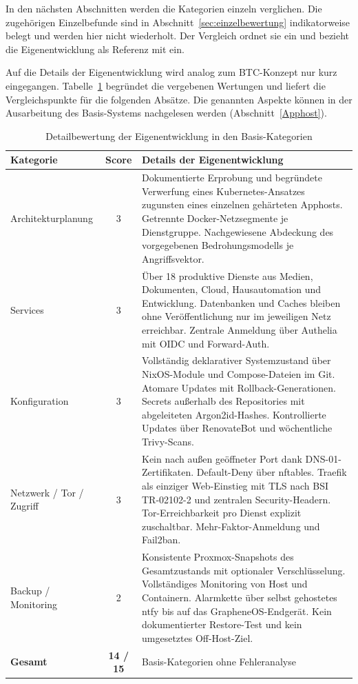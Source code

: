 {In den nächsten Abschnitten werden die Kategorien einzeln verglichen. Die zugehörigen Einzelbefunde sind in Abschnitt~\ref{sec:einzelbewertung} indikatorweise belegt und werden hier nicht wiederholt. Der Vergleich ordnet sie ein und bezieht die Eigenentwicklung als Referenz mit ein.

Auf die Details der Eigenentwicklung wird analog zum \ac{BTC}-Konzept nur kurz eingegangen. Tabelle~\ref{tab:basis-eigen-details} begründet die vergebenen Wertungen und liefert die Vergleichspunkte für die folgenden Absätze. Die genannten Aspekte können in der Ausarbeitung des Basis-Systems nachgelesen
werden (Abschnitt~\ref{Apphost}).

\begin{table}[htbp]
\centering
\footnotesize
\renewcommand{\arraystretch}{1.3}
\begin{tabularx}{\linewidth}{@{} p{4.3cm} c >{\RaggedRight\arraybackslash}X @{}}
\toprule
\textbf{Kategorie} & \textbf{Score} & \textbf{Details der Eigenentwicklung} \\
\midrule
Architekturplanung & 3 &
Dokumentierte Erprobung und begründete Verwerfung eines
Kubernetes-Ansatzes zugunsten eines einzelnen gehärteten Apphosts.
Getrennte Docker-Netzsegmente je Dienstgruppe. Nachgewiesene Abdeckung des
vorgegebenen Bedrohungsmodells je Angriffsvektor. \\
\addlinespace
Services & 3 &
Über 18 produktive Dienste aus Medien, Dokumenten, Cloud, Hausautomation
und Entwicklung. Datenbanken und Caches bleiben ohne Veröffentlichung nur im
jeweiligen Netz erreichbar. Zentrale Anmeldung über Authelia mit \ac{OIDC}
und Forward-Auth. \\
\addlinespace
Konfiguration & 3 &
Vollständig deklarativer Systemzustand über NixOS-Module und Compose-Dateien
im Git. Atomare Updates mit Rollback-Generationen. Secrets außerhalb des
Repositories mit abgeleiteten Argon2id-Hashes. Kontrollierte Updates über
RenovateBot und wöchentliche Trivy-Scans. \\
\addlinespace
Netzwerk / Tor / Zugriff & 3 &
Kein nach außen geöffneter Port dank \ac{DNS}-01-Zertifikaten. Default-Deny
über nftables. Traefik als einziger Web-Einstieg mit \ac{TLS} nach
\ac{BSI} \ac{TR}-02102-2 und zentralen Security-Headern. Tor-Erreichbarkeit
pro Dienst explizit zuschaltbar. Mehr-Faktor-Anmeldung und Fail2ban. \\
\addlinespace
Backup / Monitoring & 2 &
Konsistente Proxmox-Snapshots des Gesamtzustands mit optionaler
Verschlüsselung. Vollständiges Monitoring von Host und Containern.
Alarmkette über selbst gehostetes ntfy bis auf das GrapheneOS-Endgerät.
Kein dokumentierter Restore-Test und kein umgesetztes Off-Host-Ziel. \\
\midrule
\textbf{Gesamt} & \textbf{14 / 15} & Basis-Kategorien ohne Fehleranalyse \\
\bottomrule
\end{tabularx}
\caption{Detailbewertung der Eigenentwicklung in den Basis-Kategorien}
\label{tab:basis-eigen-details}
\end{table}

}
